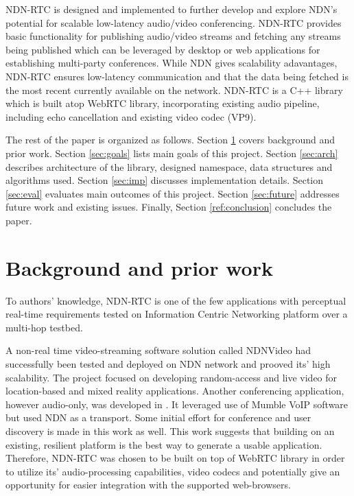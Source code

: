 \documentclass{icn/sig-alternate-2012} %
\newcommand{\ndnrtcName}{NDN-RTC} %
\begin{document}
\ndnrtcName{} is designed and implemented to further develop and explore NDN's potential for scalable low-latency audio/video conferencing. \ndnrtcName{} provides basic functionality for publishing audio/video streams and fetching any streams being published which can be leveraged by desktop or web applications for establishing multi-party conferences. While NDN gives scalability adavantages, \ndnrtcName{} ensures low-latency communication and that the data being fetched is the most recent currently available on the network. \ndnrtcName{} is a C++ library which is built atop WebRTC library, incorporating existing audio pipeline, including echo cancellation and existing video codec (VP9).

The rest of the paper is organized as follows. Section \ref{sec:bg} covers background and prior work. Section \ref{sec:goals} lists main goals of this project. Section \ref{sec:arch} describes architecture of the library, designed namespace, data structures and algorithms used. Section \ref{sec:imp} discusses implementation details. Section \ref{sec:eval} evaluates main outcomes of this project. Section \ref{sec:future} addresses future work and existing issues. Finally, Section \ref{ref:conclusion} concludes the paper.

\section{Background and prior work}
\label{sec:bg}
To authors' knowledge, \ndnrtcName{} is one of the few applications with perceptual real-time requirements tested on Information Centric Networking platform over a multi-hop testbed. 

A non-real time video-streaming software solution called NDNVideo \cite{ndnvideo} had successfully been tested and deployed on NDN network and prooved its' high scalability. The project focused on developing random-access and live video for location-based and mixed reality applications. Another conferencing application, however audio-only, was developed in \cite{act-tool}. It leveraged use of Mumble VoIP software but used NDN as a transport. Some initial effort for conference and user discovery is made in this work as well. This work suggests that building on an existing, resilient platform is the best way to generate a usable application. Therefore, \ndnrtcName{} was chosen to be built on top of WebRTC library in order to utilize its' audio-processing capabilities, video codecs and potentially give an opportunity for easier integration with the supported web-browsers.
\end{document}
